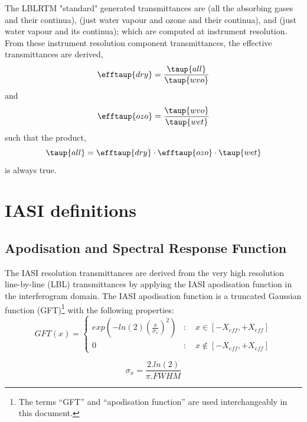 The LBLRTM "standard" generated transmittances are  (all the absorbing gases and their continua),  (just water vapour and ozone and their continua), and  (just water vapour and its continua); which are computed at instrument resolution. From these instrument resolution component transmittances, the effective transmittances are derived,
\begin{equation}
  \efftaup{dry} = \frac{\taup{all}}{\taup{wvo}}
  \label{eqn:tau_effdry}
\end{equation}
and
\begin{equation}
  \efftaup{ozo} = \frac{\taup{wvo}}{\taup{wet}}
  \label{eqn:tau_effozo}
\end{equation}
such that the product,
\begin{equation}
  \taup{all} = \efftaup{dry}\cdot\efftaup{ozo}\cdot\taup{wet}
  \label{eqn:tau_all}
\end{equation}
is always true.


\section{IASI definitions}

\subsection{Apodisation and Spectral Response Function}

The IASI resolution transmittances are derived from the very high resolution line-by-line (LBL) transmittances by applying the IASI apodisation function in the interferogram domain. The IASI apodisation function is a truncated Gaussian function (GFT)\footnote{The terms ``GFT'' and ``apodisation function'' are used interchangeably in this document.} with the following properties\cite{ref:gftppt}:
\begin{equation}
  GFT(x) = \begin{cases}
             exp\left(-ln(2)\left( \frac{x}{\sigma_{x}} \right) ^2\right) & :\quad x \in [-X_{eff},+X_{eff}] \\
             0                                                            & :\quad x \notin [-X_{eff},+X_{eff}]
           \end{cases}
\end{equation}

\begin{equation}
  \sigma_{x} = \frac{2.ln(2)}{\pi.FWHM}
\end{equation}

